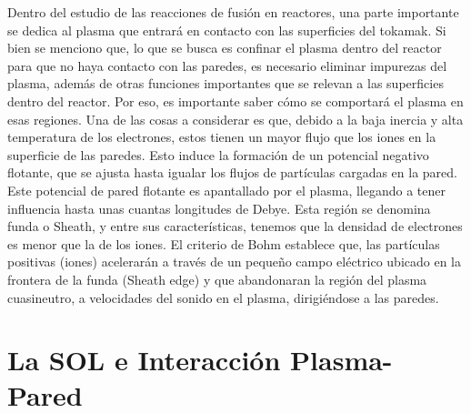 \documentclass[../main.tex]{subfiles}
\begin{document}
	Dentro del estudio de las reacciones de fusión en reactores, una parte importante se dedica al plasma que entrará en contacto con las superficies del tokamak. Si bien se menciono que, lo que se busca es confinar el plasma dentro del reactor para que no haya contacto con las paredes, es necesario eliminar impurezas del plasma, además de otras funciones importantes que se relevan a las superficies dentro del reactor. Por eso, es importante saber cómo se comportará el plasma en esas regiones. Una de las cosas a considerar es que, debido a la baja inercia y alta temperatura de los electrones, estos tienen un mayor flujo que los iones en la superficie de las paredes. Esto induce la formación de un potencial negativo flotante, que se ajusta hasta igualar los flujos de partículas cargadas en la pared. Este potencial de pared flotante es apantallado por el plasma, llegando a tener influencia hasta unas cuantas longitudes de Debye. Esta región se denomina funda o Sheath, y entre sus características, tenemos que la densidad de electrones es menor que la de los iones. El criterio de Bohm establece que, las partículas positivas (iones) acelerarán a través de un pequeño campo eléctrico ubicado en la frontera de la funda (Sheath edge) y que abandonaran la región del plasma cuasineutro, a velocidades del sonido en el plasma, dirigiéndose a las paredes.
	
	\section{La SOL e Interacción Plasma-Pared}
	
\end{document}
